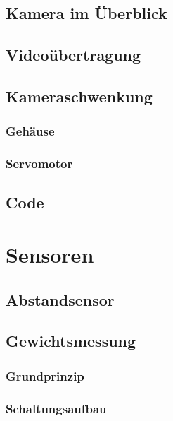 \documentclass[ngerman,12pt,a4paper]{article}
\begin{document}
		\subsection{Kamera im Überblick} %
		
		\subsection{Videoübertragung} %
		
		\subsection{Kameraschwenkung} %
		
			\subsubsection{Gehäuse} %
			
			\subsubsection{Servomotor} %
	
		\subsection{Code} %
		
\newpage
	\section{Sensoren}
	
		\subsection{Abstandsensor} %
		
		\subsection{Gewichtsmessung}
		
			\subsubsection{Grundprinzip} %
		
			\subsubsection{Schaltungsaufbau} %
		
\end{document}
